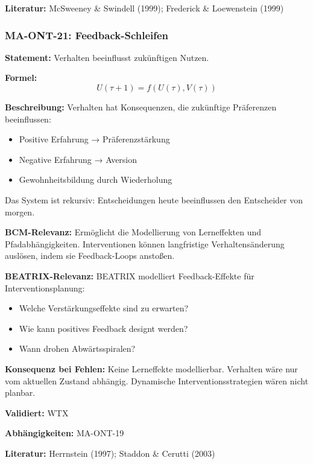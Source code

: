 \textbf{Literatur:} McSweeney \& Swindell (1999); Frederick \& Loewenstein (1999)


\subsubsection*{MA-ONT-21: Feedback-Schleifen}

\textbf{Statement:} Verhalten beeinflusst zukünftigen Nutzen.

\textbf{Formel:}
\begin{equation}
U(\tau + 1) = f(U(\tau), V(\tau))
\end{equation}

\textbf{Beschreibung:}
Verhalten hat Konsequenzen, die zukünftige Präferenzen beeinflussen:
\begin{itemize}
    \item Positive Erfahrung → Präferenzstärkung
    \item Negative Erfahrung → Aversion
    \item Gewohnheitsbildung durch Wiederholung
\end{itemize}
Das System ist rekursiv: Entscheidungen heute beeinflussen den Entscheider von morgen.

\textbf{BCM-Relevanz:}
Ermöglicht die Modellierung von Lerneffekten und Pfadabhängigkeiten. Interventionen können langfristige Verhaltensänderung auslösen, indem sie Feedback-Loops anstoßen.

\textbf{BEATRIX-Relevanz:}
BEATRIX modelliert Feedback-Effekte für Interventionsplanung:
\begin{itemize}
    \item Welche Verstärkungseffekte sind zu erwarten?
    \item Wie kann positives Feedback designt werden?
    \item Wann drohen Abwärtsspiralen?
\end{itemize}

\textbf{Konsequenz bei Fehlen:}
Keine Lerneffekte modellierbar. Verhalten wäre nur vom aktuellen Zustand abhängig. Dynamische Interventionsstrategien wären nicht planbar.

\textbf{Validiert:} WTX

\textbf{Abhängigkeiten:} MA-ONT-19

\textbf{Literatur:} Herrnstein (1997); Staddon \& Cerutti (2003)

